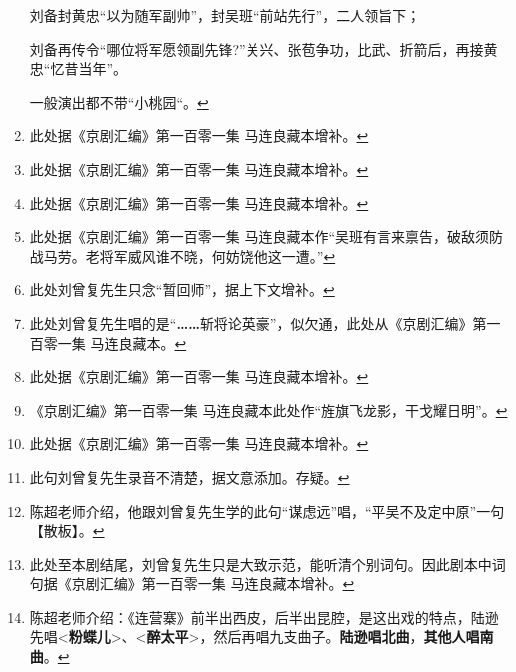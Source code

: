 \begin{enumerate}
  刘备封黄忠``以为随军副帅''，封吴班``前站先行''，二人领旨下；

  刘备再传令``哪位将军愿领副先锋?''关兴、张苞争功，比武、折箭后，再接黄忠``忆昔当年''。

  一般演出都不带``小桃园``。\protect\hyperlink{fnref200}{↩}
\item
  \leavevmode\hypertarget{fn201}{}%
  此处据《京剧汇编》第一百零一集
  马连良藏本增补。\protect\hyperlink{fnref201}{↩}
\item
  \leavevmode\hypertarget{fn202}{}%
  此处据《京剧汇编》第一百零一集
  马连良藏本增补。\protect\hyperlink{fnref202}{↩}
\item
  \leavevmode\hypertarget{fn203}{}%
  此处据《京剧汇编》第一百零一集
  马连良藏本增补。\protect\hyperlink{fnref203}{↩}
\item
  \leavevmode\hypertarget{fn204}{}%
  此处据《京剧汇编》第一百零一集
  马连良藏本作``吴班有言来禀告，破敌须防战马劳。老将军威风谁不晓，何妨饶他这一遭。''\protect\hyperlink{fnref204}{↩}
\item
  \leavevmode\hypertarget{fn205}{}%
  此处刘曾复先生只念``暂回师''，据上下文增补。\protect\hyperlink{fnref205}{↩}
\item
  \leavevmode\hypertarget{fn206}{}%
  此处刘曾复先生唱的是``\textbf{\ldots{}\ldots{}}斩将论英豪''，似欠通，此处从《京剧汇编》第一百零一集
  马连良藏本。\protect\hyperlink{fnref206}{↩}
\item
  \leavevmode\hypertarget{fn207}{}%
  此处据《京剧汇编》第一百零一集
  马连良藏本增补。\protect\hyperlink{fnref207}{↩}
\item
  \leavevmode\hypertarget{fn208}{}%
  《京剧汇编》第一百零一集
  马连良藏本此处作``旌旗飞龙影，干戈耀日明''。\protect\hyperlink{fnref208}{↩}
\item
  \leavevmode\hypertarget{fn209}{}%
  此处据《京剧汇编》第一百零一集
  马连良藏本增补。\protect\hyperlink{fnref209}{↩}
\item
  \leavevmode\hypertarget{fn210}{}%
  此句刘曾复先生录音不清楚，据文意添加。存疑。\protect\hyperlink{fnref210}{↩}
\item
  \leavevmode\hypertarget{fn211}{}%
  陈超老师介绍，他跟刘曾复先生学的此句``谋虑远''唱，``平吴不及定中原''一句【散板】。\protect\hyperlink{fnref211}{↩}
\item
  \leavevmode\hypertarget{fn212}{}%
  此处至本剧结尾，刘曾复先生只是大致示范，能听清个别词句。因此剧本中词句据《京剧汇编》第一百零一集
  马连良藏本增补。\protect\hyperlink{fnref212}{↩}
\item
  \leavevmode\hypertarget{fn213}{}%
  陈超老师介绍：《连营寨》前半出西皮，后半出昆腔，是这出戏的特点，陆逊先唱\textless{}\textbf{粉蝶儿}\textgreater{}、\textless{}\textbf{醉太平}\textgreater{}，然后再唱九支曲子。\textbf{陆逊唱北曲}，\textbf{其他人唱南曲}。\protect\hyperlink{fnref213}{↩}

\end{enumerate}
